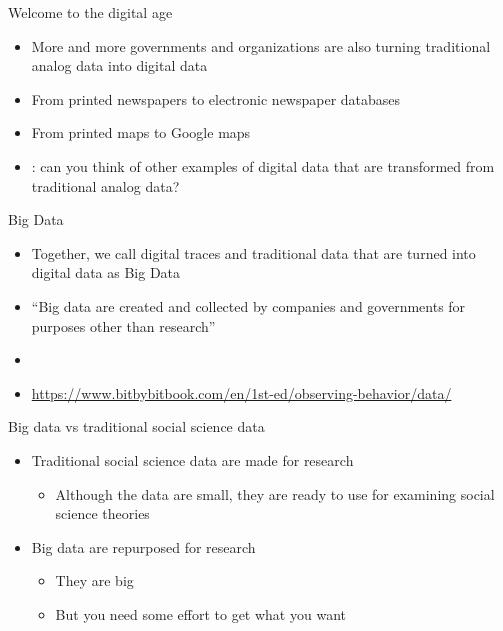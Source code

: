 \documentclass[handout]{beamer}
\begin{document}
\begin{frame}[label={h:a67b0375-9572-433f-af51-98d5fc83a060}]{Welcome to the digital age}
\begin{itemize}
\item More and more governments and organizations are also turning traditional analog data into digital data
\item From printed newspapers to electronic newspaper databases
\item From printed maps to Google maps
\item{}: can you think of other examples of digital data that are transformed from traditional analog data?
\end{itemize}
\end{frame}

\begin{frame}[label={h:04513c0c-1de5-44d8-9fb9-15125539a826}]{Big Data}
\begin{itemize}
\item Together, we call digital traces and traditional data that are turned into digital data as \alert{Big Data}
\item ``Big data are created and collected by companies and governments \alert{for purposes other than research}''
\item {}
\item \url{https://www.bitbybitbook.com/en/1st-ed/observing-behavior/data/}
\end{itemize}
\end{frame}

\begin{frame}[label={h:583acb28-273c-4fe2-8550-e4528741ebf9}]{Big data vs traditional social science data}
\begin{itemize}
\item Traditional social science data are made for research
\begin{itemize}
\item Although the data are small, they are ready to use for examining social science theories
\end{itemize}
\item Big data are \alert{repurposed} for research
\begin{itemize}
\item They are big
\item But you need some effort to get what you want
\end{itemize}
\end{itemize}
\end{frame}
\end{document}
